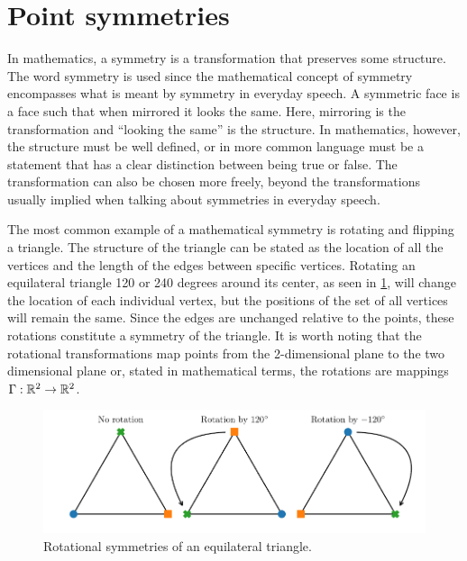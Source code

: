 \section{Point symmetries}

In mathematics, a symmetry is a transformation that preserves some structure.
The word symmetry is used since the mathematical concept of symmetry encompasses what is meant by symmetry in everyday speech.
A symmetric face is a face such that when mirrored it looks the same.
Here, mirroring is the transformation and \enquote{looking the same} is the structure.
In mathematics, however, the structure must be well defined, or in more common language must be a statement that has a clear distinction between being true or false.
The transformation can also be chosen more freely, beyond the transformations usually implied when talking about symmetries in everyday speech.

The most common example of a mathematical symmetry is rotating and flipping a triangle.
The structure of the triangle can be stated as the location of all the vertices and the length of the edges between specific vertices.
Rotating an equilateral triangle 120 or 240 degrees around its center, as seen in \cref{fig:triangle-rotation}, will change the location of each individual vertex, but the positions of the set of all vertices will remain the same.
Since the edges are unchanged relative to the points, these rotations constitute a symmetry of the triangle.
It is worth noting that the rotational transformations map points from the 2-dimensional plane to the two dimensional plane or, stated in mathematical terms, the rotations are mappings \(\Gamma: \mathbb{R}^2 \to \mathbb{R}^2\).
\begin{figure}
  \centering
  \includegraphics[width=.96\textwidth]{images/triangles}
  \caption{Rotational symmetries of an equilateral triangle.}
  \label{fig:triangle-rotation}
\end{figure}

